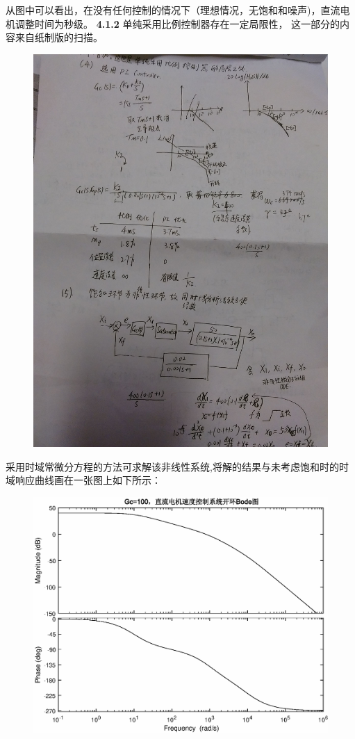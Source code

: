 \documentclass[10.5pt]{ctexart}
\begin{document}
从图中可以看出，在没有任何控制的情况下（理想情况，无饱和和噪声)，直流电机调整时间为秒级。
\newpage
\textbf{4.1.2}
单纯采用比例控制器存在一定局限性，
这一部分的内容来自纸制版的扫描。
\begin{figure}[!ht]
\centering
\includegraphics[width=400pt]{IMG_20161224_201704.jpg}
\end{figure}

采用时域常微分方程的方法可求解该非线性系统,将解的结果与未考虑饱和时的时域响应曲线画在一张图上如下所示：

\begin{figure}[!ht]
\centering
\includegraphics[width=400pt]{bode_plot_4121.eps}
\end{figure}
\end{document}
